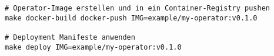 \begin{verbatim}
# Operator-Image erstellen und in ein Container-Registry pushen
make docker-build docker-push IMG=example/my-operator:v0.1.0

# Deployment Manifeste anwenden
make deploy IMG=example/my-operator:v0.1.0
\end{verbatim}